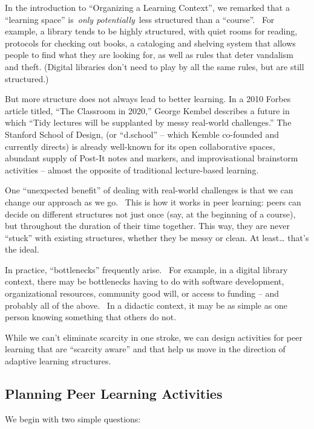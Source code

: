 In the introduction to ``Organizing a Learning Context'', we remarked
that a ``learning space'' is~\emph{only potentially}~less structured
than a ``course''. ~For example, a library tends to be highly
structured, with quiet rooms for reading, protocols for checking out
books, a cataloging and shelving system that allows people to find what
they are looking for, as well as rules that deter vandalism and theft.
(Digital libraries don't need to play by all the same rules, but are
still structured.)

But more structure does not always lead to better learning. In a 2010
Forbes article titled, ``The Classroom in 2020,'' George Kembel
describes a future in which ``Tidy lectures will be supplanted by messy
real-world challenges.'' The Stanford School of Design, (or ``d.school''
-- which Kemble co-founded and currently directs) is already well-known
for its open collaborative spaces, abundant supply of Post-It notes and
markers, and improvisational brainstorm activities -- almost the
opposite of traditional lecture-based learning.

One ``unexpected benefit'' of dealing with real-world challenges is that
we can change our approach as we go. ~This is how it works in peer
learning: peers can decide on different structures not just once (say,
at the beginning of a course), but throughout the duration of their time
together. This way, they are never ``stuck'' with existing structures,
whether they be messy or clean. At least\ldots{} that's the ideal.

In practice, ``bottlenecks'' frequently arise. ~For example, in a
digital library context, there may be bottlenecks having to do with
software development, organizational resources, community good will, or
access to funding -- and probably all of the above. ~In a didactic
context, it may be as simple as one person knowing something that others
do not.

While we can't eliminate scarcity in one stroke, we can design
activities for peer learning that are ``scarcity aware'' and that help
us move in the direction of adaptive learning structures.

\hypertarget{planning-peer-learning-activities}{%
\subsection{Planning Peer Learning
Activities}\label{planning-peer-learning-activities}}

We begin with two simple questions:

